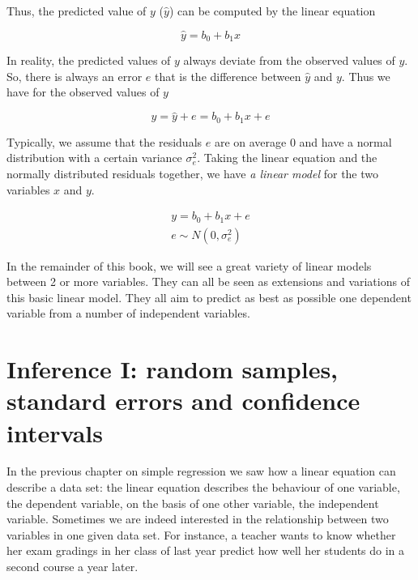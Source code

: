 \documentclass[]{report}\usepackage[]{graphicx}\usepackage[]{color}
\begin{document}
Thus, the predicted value of $y$ ($\hat{y}$) can be computed by the linear equation

\begin{equation}
\hat{y}= b_0 + b_1 x
\end{equation}

In reality, the predicted values of $y$ always deviate from the observed values of $y$. So, there is always an error $e$ that is the difference between $\hat{y}$ and $y$. Thus we have for the observed values of $y$

\begin{equation}
y = \hat{y} + e = b_0 + b_1 x + e
\end{equation}

Typically, we assume that the residuals $e$ are on average 0 and have a normal distribution with a certain variance $\sigma^2_e$. Taking the linear equation and the normally distributed residuals together, we have \textit{a linear model} for the two variables $x$ and $y$.


\begin{eqnarray}
y = b_0 + b_1 x + e \\
e \sim N(0,\sigma^2_e)
\end{eqnarray}

In the remainder of this book, we will see a great variety of linear models between 2 or more variables. They can all be seen as extensions and variations of this basic linear model. They all aim to predict as best as possible one dependent variable from a number of independent variables. %
% 




\chapter{Inference I: random samples, standard errors and confidence intervals}\label{chap:confidence}

In the previous chapter on simple regression we saw how a linear equation can describe a data set: the linear equation describes the behaviour of one variable, the dependent variable, on the basis of one other variable, the independent variable. Sometimes we are indeed interested in the relationship between two variables in one given data set. For instance, a teacher wants to know whether her exam gradings in her class of last year predict how well her students do in a second course a year later.
\end{document}
